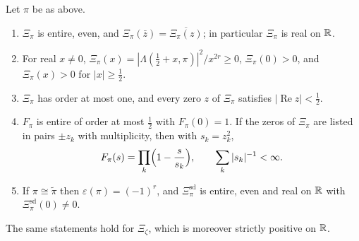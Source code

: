 \begin{lemma}\label{lem:10bcompletion}
Let $\pi$ be as above.
\begin{enumerate}
\item[(i)] $\Xi_\pi$ is entire, even, and $\Xi_\pi(\bar z) = \overline{\Xi_\pi(z)}$; in particular $\Xi_\pi$ is real on $\mathbb{R}$.
\item[(ii)] For real $x\ne0$, $\Xi_\pi(x) = |\Lambda(\frac12+x,\pi)|^2/x^{2r}\ge0$, $\Xi_\pi(0)>0$, and $\Xi_\pi(x)>0$ for $|x|\ge\frac12$.
\item[(iii)] $\Xi_\pi$ has order at most one, and every zero $z$ of $\Xi_\pi$ satisfies $|\operatorname{Re}z|<\frac12$.
\item[(iv)] $F_\pi$ is entire of order at most $\frac12$ with $F_\pi(0)=1$. If the zeros of $\Xi_\pi$ are listed in pairs $\pm z_k$ with multiplicity, then with $s_k = z_k^2$,
\[
F_\pi(s) = \prod_k\Bigl(1-\frac{s}{s_k}\Bigr),\qquad\sum_k|s_k|^{-1}<\infty .
\]
\item[(v)] If $\pi\cong\tilde\pi$ then $\varepsilon(\pi) = (-1)^r$, and $\Xi^{\mathrm{sd}}_\pi$ is entire, even and real on $\mathbb{R}$ with $\Xi^{\mathrm{sd}}_\pi(0)\ne0$.
\end{enumerate}
The same statements hold for $\Xi_\zeta$, which is moreover strictly positive on $\mathbb{R}$.
\end{lemma}

